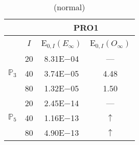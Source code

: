 \begin{table}[H]
\caption{(normal)}
\setlength{\tabcolsep}{5pt}
\centering
\begin{tabular}{@{}l c c c@{}}
\toprule
 &  & \multicolumn{2}{c}{PRO1}\\
\midrule
 & $I$ & E$_{0,I}(E_{\infty})$ & E$_{0,I}(O_{\infty})$\\
\midrule
\multirow{3}{*}{$\mathbb{P}_{3}$}
 & 20 & 8.31E$-$04 & ---\\
 & 40 & 3.74E$-$05 & 4.48\\
 & 80 & 1.32E$-$05 & 1.50\\
\midrule
\multirow{3}{*}{$\mathbb{P}_{5}$}
 & 20 & 2.45E$-$14 & ---\\
 & 40 & 1.16E$-$13 & $\uparrow$\\
 & 80 & 4.90E$-$13 & $\uparrow$\\
\bottomrule
\end{tabular}
\label{Table:PRO:test_01_01_test49_pro1}
\end{table}
